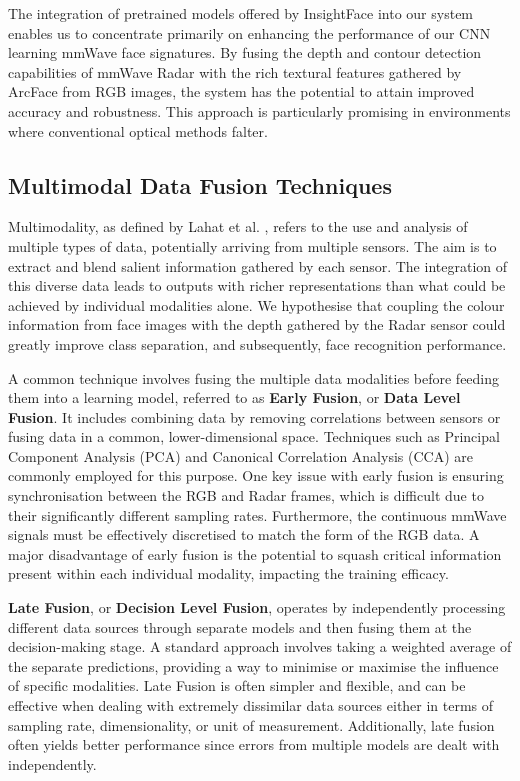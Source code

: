 \documentclass{interim}
\begin{document}
The integration of pretrained models offered by InsightFace into our system enables us to concentrate primarily on enhancing the performance of our CNN learning mmWave face signatures. By fusing the depth and contour detection capabilities of mmWave Radar with the rich textural features gathered by ArcFace from RGB images, the system has the potential to attain improved accuracy and robustness. This approach is particularly promising in environments where conventional optical methods falter.


\subsection{Multimodal Data Fusion Techniques}
\label{background:multimodal_data_fusion_techniques}
Multimodality, as defined by Lahat et al. \cite{lahat2015multimodal}, refers to the use and analysis of multiple types of data, potentially arriving from multiple sensors. The aim is to extract and blend salient information gathered by each sensor. The integration of this diverse data leads to outputs with richer representations than what could be achieved by individual modalities alone. We hypothesise that coupling the colour information from face images with the depth gathered by the Radar sensor could greatly improve class separation, and subsequently, face recognition performance.


A common technique involves fusing the multiple data modalities before feeding them into a learning model, referred to as \textbf{Early Fusion}, or \textbf{Data Level Fusion}. It includes combining data by removing correlations between sensors or fusing data in a common, lower-dimensional space. Techniques such as Principal Component Analysis (PCA) and Canonical Correlation Analysis (CCA) are commonly employed for this purpose. One key issue with early fusion is ensuring synchronisation between the RGB and Radar frames, which is difficult due to their significantly different sampling rates. Furthermore, the continuous mmWave signals must be effectively discretised to match the form of the RGB data. A major disadvantage of early fusion is the potential to squash critical information present within each individual modality, impacting the training efficacy.

\textbf{Late Fusion}, or \textbf{Decision Level Fusion}, operates by independently processing different data sources through separate models and then fusing them at the decision-making stage. A standard approach involves taking a weighted average of the separate predictions, providing a way to minimise or maximise the influence of specific modalities. Late Fusion is often simpler and flexible, and can be effective when dealing with extremely dissimilar data sources either in terms of sampling rate, dimensionality, or unit of measurement. Additionally, late fusion often yields better performance since errors from multiple models are dealt with independently.
\end{document}
